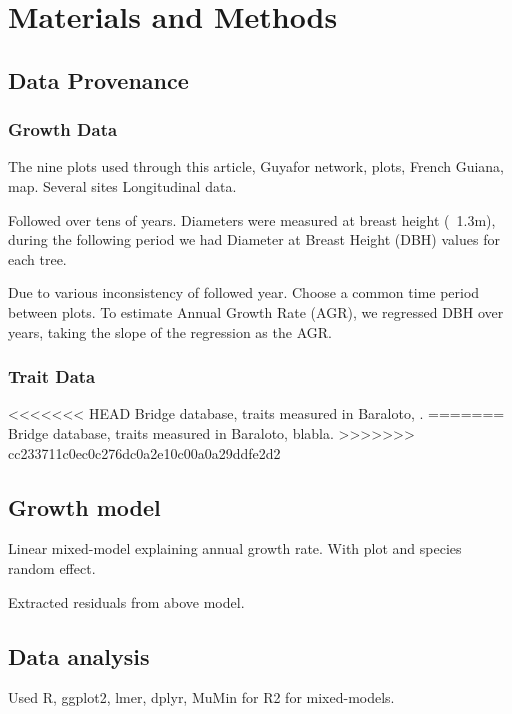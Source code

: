 \section*{Materials and Methods}
\label{sec:M&M}

\subsection*{Data Provenance}

\subsubsection*{Growth Data}
The nine plots used through this article,
Guyafor network, plots,
French Guiana, map. Several sites
Longitudinal data.

Followed over tens of years. Diameters were measured at breast height (~1.3m), during the following period we had Diameter at Breast Height (DBH) values for each tree.

Due to various inconsistency of followed year. Choose a common time period between plots. To estimate Annual Growth Rate (AGR), we regressed DBH over years, taking the slope of the regression as the AGR.

\subsubsection*{Trait Data}

<<<<<<< HEAD
Bridge database, traits measured in Baraloto, \citep{baraloto_functional_2010, baraloto_decoupled_2010}.
=======
Bridge database, traits measured in Baraloto, blabla.
>>>>>>> cc233711c0ec0c276dc0a2e10c00a0a29ddfe2d2

\subsection*{Growth model}

Linear mixed-model explaining annual growth rate. With plot and species random effect.

Extracted residuals from above model.

\subsection*{Data analysis}

Used R, ggplot2, lmer, dplyr, MuMin for R2 for mixed-models.